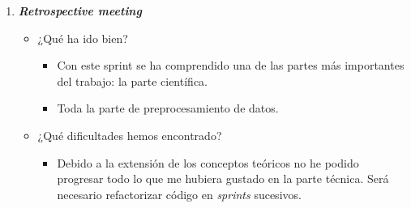 \begin{enumerate}
\begin{itemize}
\end{itemize}
\item \textbf{\textit{Retrospective meeting}}
\begin{itemize}
	\item ¿Qué ha ido bien?
	\begin{itemize}
		\item Con este sprint se ha comprendido una de las partes más importantes del trabajo: la parte científica.
		\item Toda la parte de preprocesamiento de datos.
	\end{itemize}
	\item ¿Qué dificultades hemos encontrado?
	\begin{itemize}
		\item Debido a la extensión de los conceptos teóricos no he podido progresar todo lo que me hubiera gustado en la parte técnica. Será necesario refactorizar código en \textit{sprints} sucesivos.
	\end{itemize}
\end{itemize}	
\end{enumerate}

